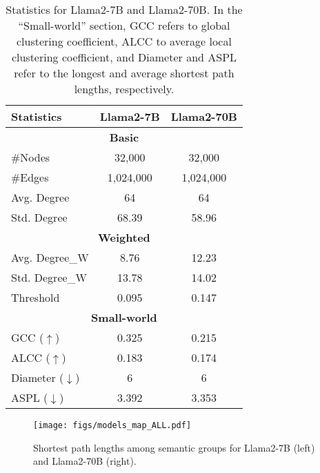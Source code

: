 
\begin{table}[h!]
\centering
\begin{tabular}{lcc}
\toprule
\textbf{Statistics} & \textbf{Llama2-7B} & \textbf{Llama2-70B} \\
\midrule
\multicolumn{3}{c}{\textbf{Basic}} \\  
\cmidrule(lr){1-3}
\#Nodes & 32,000 & 32,000 \\
\#Edges & 1,024,000 & 1,024,000 \\
Avg. Degree & 64 & 64 \\
Std. Degree & 68.39 & 58.96 \\
\midrule
\multicolumn{3}{c}{\textbf{Weighted}} \\  
\cmidrule(lr){1-3}
Avg. Degree\_W & 8.76 & 12.23 \\
Std. Degree\_W & 13.78 & 14.02 \\
Threshold & 0.095 & 0.147 \\
\midrule
\multicolumn{3}{c}{\textbf{Small-world}} \\  
\cmidrule(lr){1-3}
GCC ($\uparrow$) & 0.325 & 0.215 \\
ALCC ($\uparrow$) & 0.183 & 0.174 \\
Diameter ($\downarrow$) & 6 & 6 \\
ASPL ($\downarrow$) & 3.392 & 3.353 \\
\bottomrule
\end{tabular}
\caption{Statistics for Llama2-7B and Llama2-70B. In the ``Small-world'' section, GCC refers to global clustering coefficient, ALCC to average local clustering coefficient, and Diameter and ASPL refer to the longest and average shortest path lengths, respectively.}
\label{tab:statistics}
\end{table}

\begin{figure*}[h!]
    \centering
    \texttt{[image: figs/models\_map\_ALL.pdf]}
    \caption{Shortest path lengths among semantic groups for Llama2-7B (left) and Llama2-70B (right).}
    \label{fig:shortest_path}
\end{figure*}


